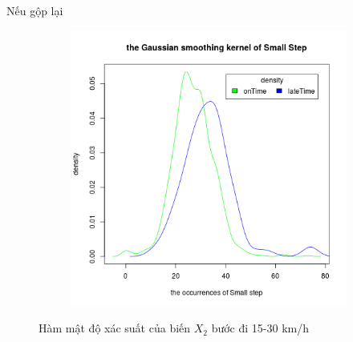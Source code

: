 \documentclass[a4paper, 13pt]{report}
\begin{document}
\FloatBarrier
Nếu gộp lại \\
\FloatBarrier
\begin{figure}[h]
    \begin{subfigure}[b]{0.7\textwidth}
        \includegraphics[width=\textwidth]{DensitySmallStep.png}
    \end{subfigure}
    \caption*{Hàm mật độ xác suất của biến $X_2$ bước đi 15-30 km/h}
\end{figure}
\FloatBarrier
\end{document}
